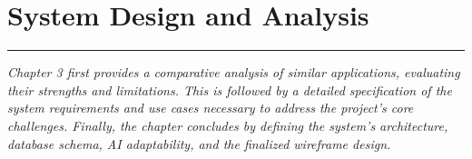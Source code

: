 \chapter {System Design and Analysis}
\noindent
\rule{\textwidth}{0.4pt}

\begin{center}
\begin{minipage}{0.8\textwidth}
\textit{Chapter 3 first provides a comparative analysis of similar applications, evaluating their strengths and limitations. This is followed by a detailed specification of the system requirements and use cases necessary to address the project's core challenges. Finally, the chapter concludes by defining the system's architecture, database schema, AI adaptability, and the finalized wireframe design.}
\end{minipage}
\end{center}
